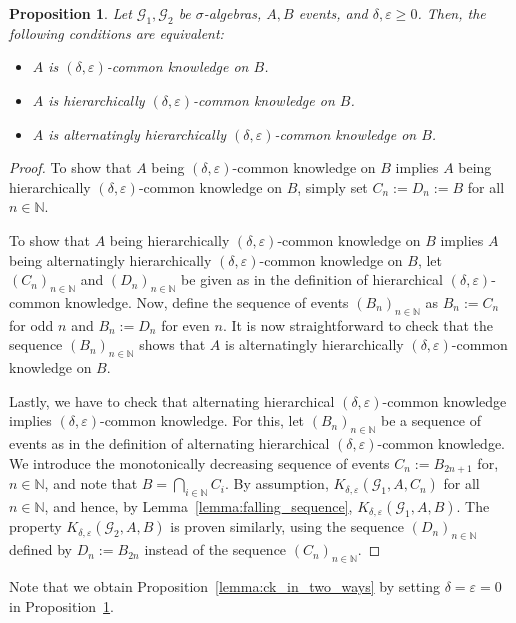 \documentclass[a4paper, 10pt]{article}
\numberwithin{theorem}{section}
\newtheorem{prop}[theorem]{Proposition}
\theoremstyle{definition}
\newcommand{\N}{\mathbb{N}}
\newcommand{\G}{\mathcal{G}}
\renewcommand{\epsilon}{\varepsilon}
\begin{document}
\begin{prop}\label{prop:equivalences_of_near_common_knowledge}
	Let $\G_1,\G_2$ be $\sigma$-algebras, $A,B$ events, and $\delta, \epsilon \geq 0$. Then, the following conditions are equivalent:
	\begin{itemize}
		\item [(1)]  $A$ is $(\delta, \epsilon)$-common knowledge on $B$. 
		\item [(2)]  $A$ is hierarchically $(\delta, \epsilon)$-common knowledge on $B$. 
		\item [(3)]  $A$ is alternatingly hierarchically $(\delta, \epsilon)$-common knowledge on $B$.
	\end{itemize}
\end{prop}

\begin{proof}
	To show that $A$ being $(\delta,\epsilon)$-common knowledge on $B$ implies $A$ being hierarchically  $(\delta,\epsilon)$-common knowledge on $B$, simply set $C_n:=D_n:=B$ for all $n \in \N$.
	
	To show that $A$ being hierarchically $(\delta,\epsilon)$-common knowledge on $B$ implies $A$ being alternatingly hierarchically  $(\delta,\epsilon)$-common knowledge on $B$, let $(C_n)_{n\in \N}$ and $(D_n)_{n\in \N}$ be given as in the definition of hierarchical $(\delta,\epsilon)$-common knowledge. Now, define the sequence of events $(B_n)_{n \in \N}$ as $B_n:=C_n$ for odd $n$ and $B_n:=D_n$ for even $n$. It is now straightforward to check that the sequence $(B_n)_{n \in \N}$ shows that $A$ is alternatingly hierarchically $(\delta,\epsilon)$-common knowledge on $B$.
	
	Lastly, we have to check that alternating hierarchical $(\delta,\epsilon)$-common knowledge implies $(\delta,\epsilon)$-common knowledge. For this, let $(B_n)_{n \in \N}$ be a sequence of events as in the definition of alternating hierarchical $(\delta,\epsilon)$-common knowledge. We introduce the monotonically decreasing sequence of events $C_n:=B_{2n+1}$ for, $n \in \N$, and note that $B=\bigcap_{i \in \N}C_i.$ By assumption, $K_{\delta,\epsilon}(\G_1,A,C_n)$ for all $n \in \N$, and hence, by Lemma~\ref{lemma:falling_sequence}, $K_{\delta,\epsilon}(\G_1,A,B)$. The property $K_{\delta,\epsilon}(\G_2,A,B)$ is proven similarly, using the sequence $(D_n)_{n\in \N}$ defined by $D_n:=B_{2n}$ instead of the sequence $(C_n)_{n \in \N}.$
\end{proof}

Note that we obtain Proposition~\ref{lemma:ck_in_two_ways} by setting $\delta=\epsilon=0$ in Proposition~\ref{prop:equivalences_of_near_common_knowledge}.  
\end{document}
